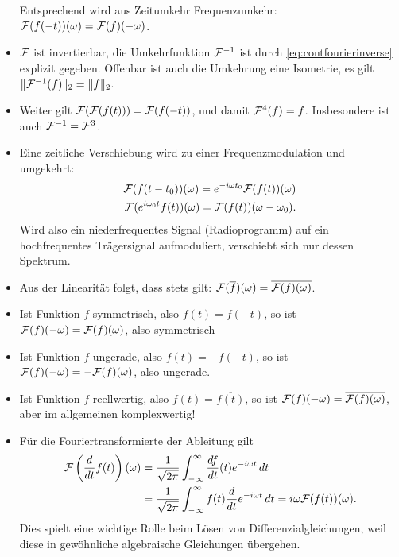 \begin{itemize}
  Entsprechend wird aus Zeitumkehr Frequenzumkehr: $\mathcal F(f(-t))(\omega)
  = \mathcal F(f)(-\omega)$.
\item $\mathcal F$ ist invertierbar, die Umkehrfunktion $\mathcal F^{-1}$ ist durch
  \eqref{eq:contfourierinverse} explizit gegeben. Offenbar ist auch
  die Umkehrung eine Isometrie, es gilt $\lVert \mathcal F^{-1}(f)
  \rVert_2 =\lVert f \rVert_2$.
\item Weiter gilt $\mathcal F(\mathcal F(f(t))) = \mathcal F(f(-t))$, und damit $\mathcal F^4(f) =
  f$. Insbesondere ist auch $\mathcal F^{-1} = \mathcal F^3$.
\item Eine zeitliche Verschiebung wird zu einer Frequenzmodulation und
  umgekehrt:
  \begin{eqnarray}
    \label{eq:fouriertimeshift}
    \mathcal F(f(t-t_0))(\omega) = e^{-i\omega t_0} \mathcal F(f(t))(\omega)\\
    \label{eq:fourierfreqshift}
    \mathcal F(e^{i\omega_0 t}f(t))(\omega) = \mathcal F(f(t))(\omega-\omega_0).
  \end{eqnarray}
  Wird also ein niederfrequentes Signal (Radioprogramm) auf ein
  hochfrequentes Trägersignal aufmoduliert, verschiebt sich nur dessen
  Spektrum. 
\item Aus der Linearität folgt, dass stets gilt:
  $\mathcal F(\overline{f})(\omega) = \overline{\mathcal F(f)(\omega)}$.
\item Ist Funktion $f$ symmetrisch, also $f(t) = f(-t)$, so ist
  $\mathcal F(f)(-\omega) = \mathcal F(f)(\omega)$, also symmetrisch
\item Ist Funktion $f$ ungerade, also $f(t) = -f(-t)$, so ist
  $\mathcal F(f)(-\omega) = -\mathcal F(f)(\omega)$, also ungerade.
\item Ist Funktion $f$ reellwertig, also $f(t) = \overline{f(t)}$, so
  ist $\mathcal F(f)(-\omega) = \overline{\mathcal F(f)(\omega)}$, aber im
  allgemeinen komplexwertig!
\item Für die Fouriertransformierte der Ableitung gilt
  \begin{equation}
    \begin{split}
      \mathcal F\left(\frac{d}{dt}f(t)\right)(\omega) &=
      \frac{1}{\sqrt{2\pi}}\int_{-\infty}^{\infty}
      \frac{df}{dt}(t)e^{-i
        \omega t}\, dt\\
      &= \frac{1}{\sqrt{2\pi}}\int_{-\infty}^{\infty}
      f(t)\frac{d}{dt}e^{-i \omega t}\, dt = i\omega
      \mathcal F(f(t))(\omega).
    \end{split}
  \end{equation}
  Dies spielt eine wichtige Rolle beim Lösen von
  Differenzialgleichungen, weil diese in gewöhnliche algebraische
  Gleichungen übergehen.

\end{itemize}
